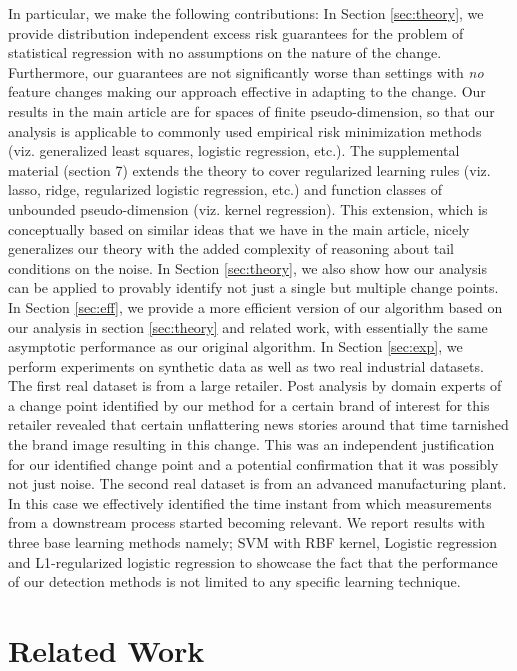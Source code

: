 \documentclass{article}
\begin{document}
In particular, we make the following contributions: 
In Section \ref{sec:theory}, we provide distribution independent
  excess risk guarantees for the problem of statistical regression
  with no assumptions on the nature of the change. Furthermore, our guarantees are not
significantly worse than settings with \emph{no} feature changes 
making our approach effective in adapting to the change. Our results in the
  main article are for spaces of finite pseudo-dimension, so that our
  analysis is applicable to commonly used empirical risk minimization
  methods (viz. generalized least squares, logistic regression, etc.).
  The supplemental material (section 7) extends the theory to cover regularized
  learning rules (viz. lasso, ridge, regularized logistic regression,
  etc.)  and function classes of unbounded pseudo-dimension
  (viz. kernel regression). This extension, which is conceptually based on similar ideas that we have in the main article, nicely generalizes our theory with the added complexity of reasoning about tail conditions on the noise. In Section \ref{sec:theory}, we also show how our analysis can
  be applied to provably identify not just a single but multiple
  change points.
In Section \ref{sec:eff}, we provide a more efficient version of
  our algorithm based on our analysis in section \ref{sec:theory} and
  related work, with essentially the same asymptotic performance as
  our original algorithm.
In Section \ref{sec:exp}, we perform experiments on synthetic data as well as two real industrial datasets. The first real dataset is from a large retailer. Post analysis by domain experts of a change point identified by our method for a certain brand of interest for this retailer revealed that certain unflattering news stories around that time tarnished the brand image resulting in this change. This was an independent justification for our identified change point and a potential confirmation that it was possibly not just noise. The second real dataset is from an advanced manufacturing plant. In this case we effectively identified the time instant from which measurements from a downstream process started becoming relevant. We report results with three base learning methods namely; SVM with RBF kernel, Logistic regression and L1-regularized logistic regression to showcase the fact that the performance of our detection methods is not limited to any specific learning technique.

\section{Related Work}
\end{document}
